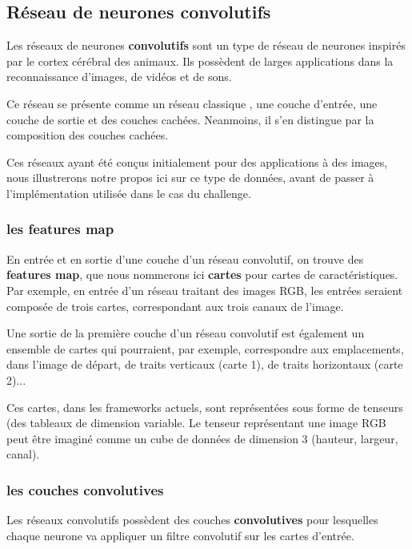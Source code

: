 \hypertarget{Ruxe9seau-de-neurones-convolutif}{%
\subsection{Réseau de neurones convolutifs}
\label{Ruxe9seau-de-neurones-convolutif}}

Les réseaux de neurones \textbf{convolutifs} sont un type de réseau de neurones
inspirés par le cortex cérébral des animaux.
Ils possèdent de larges applications dans la reconnaissance d'images, de vidéos
et de sons.

Ce réseau se présente comme un réseau classique , une couche d'entrée,
une couche de sortie et des couches cachées.
Neanmoins, il s'en distingue par la composition des couches cachées.

Ces réseaux ayant été conçus initialement pour des applications à des images,
nous illustrerons notre propos ici sur ce type de données, avant de passer
à l'implémentation utilisée dans le cas du challenge.

\subsubsection{les features map}

En entrée et en sortie d'une couche d'un réseau convolutif, on trouve des
\textbf{features map}, que nous nommerons ici \textbf{cartes} pour cartes de
caractéristiques.
Par exemple, en entrée d'un réseau traitant des images RGB, les entrées
seraient composée de trois cartes, correspondant aux trois canaux de l'image.

Une sortie de la première couche d'un réseau convolutif est également un
ensemble de cartes qui pourraient, par exemple, correspondre aux emplacements,
dans l'image de départ, de traits verticaux (carte 1), de traits horizontaux
(carte 2)...

Ces cartes, dans les frameworks actuels, sont représentées sous forme de
tenseurs (des tableaux de dimension variable.
Le tenseur représentant une image RGB peut être imaginé comme un cube de données
de dimension 3 (hauteur, largeur, canal).

\subsubsection{les couches convolutives}

Les réseaux convolutifs possèdent des couches \textbf{convolutives}
pour lesquelles chaque neurone va appliquer un filtre convolutif
sur les cartes d'entrée.

